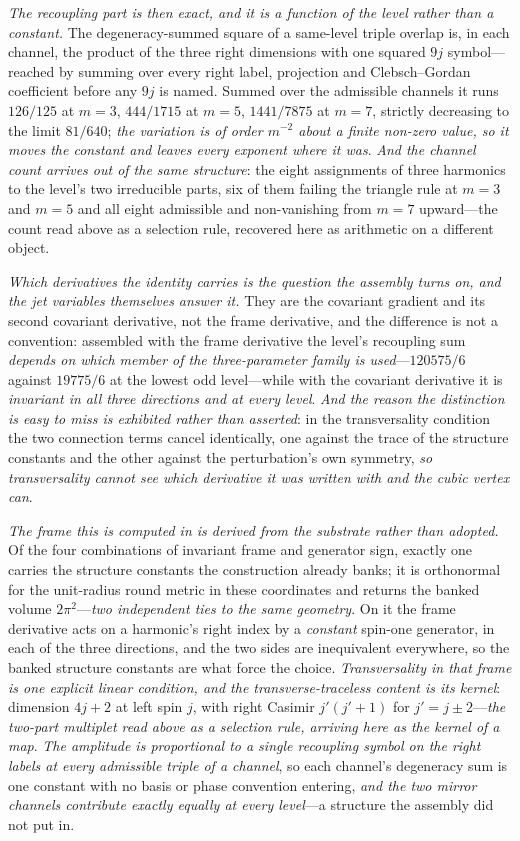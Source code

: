 \documentclass[11pt,a4paper]{article}
\theoremstyle{plain}
\theoremstyle{definition}
\theoremstyle{remark}
\begin{document}
\emph{The recoupling part is then exact, and it is a function of the level rather than a constant.} The
degeneracy-summed square of a same-level triple overlap is, in each channel, the product of the three right
dimensions with one squared $9j$ symbol---reached by summing over every right label, projection and
Clebsch--Gordan coefficient before any $9j$ is named. Summed over the admissible channels it runs
$126/125$ at $m=3$, $444/1715$ at $m=5$, $1441/7875$ at $m=7$, strictly decreasing to the limit $81/640$;
\emph{the variation is of order $m^{-2}$ about a finite non-zero value, so it moves the constant and leaves
every exponent where it was}. \emph{And the channel count arrives out of the same structure}: the eight
assignments of three harmonics to the level's two irreducible parts, six of them failing the triangle rule at
$m=3$ and $m=5$ and all eight admissible and non-vanishing from $m=7$ upward---the count read above as a
selection rule, recovered here as arithmetic on a different object.

\emph{Which derivatives the identity carries is the question the assembly turns on, and the jet variables
themselves answer it.} They are the covariant gradient and its second covariant derivative, not the frame
derivative, and the difference is not a convention: assembled with the frame derivative the level's recoupling
sum \emph{depends on which member of the three-parameter family is used}---$120575/6$ against $19775/6$ at the
lowest odd level---while with the covariant derivative it is \emph{invariant in all three directions and at
every level}. \emph{And the reason the distinction is easy to miss is exhibited rather than asserted}: in the
transversality condition the two connection terms cancel identically, one against the trace of the structure
constants and the other against the perturbation's own symmetry, \emph{so transversality cannot see which
derivative it was written with and the cubic vertex can}.

\emph{The frame this is computed in is derived from the substrate rather than adopted.} Of the four combinations
of invariant frame and generator sign, exactly one carries the structure constants the construction already
banks; it is orthonormal for the unit-radius round metric in these coordinates and returns the banked volume
$2\pi^{2}$---\emph{two independent ties to the same geometry}. On it the frame derivative acts on a harmonic's
right index by a \emph{constant} spin-one generator, in each of the three directions, and the two sides are
inequivalent everywhere, so the banked structure constants are what force the choice. \emph{Transversality in
that frame is one explicit linear condition, and the transverse-traceless content is its kernel}: dimension
$4j+2$ at left spin $j$, with right Casimir $j'(j'+1)$ for $j'=j\pm2$---\emph{the two-part multiplet read above
as a selection rule, arriving here as the kernel of a map}. \emph{The amplitude is proportional to a single
recoupling symbol on the right labels at every admissible triple of a channel}, so each channel's degeneracy sum
is one constant with no basis or phase convention entering, \emph{and the two mirror channels contribute exactly
equally at every level}---a structure the assembly did not put in.
\end{document}
